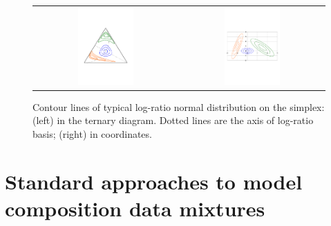 \documentclass[10pt, a4paper]{article}
\begin{document}
\begin{figure}[thbp]
\begin{center}
\begin{tabular}{cc}
  \includegraphics[trim=0cm 6cm 0cm 4cm,width=0.4\textwidth]{fig01_elipsesS3Axes.pdf} &\includegraphics[trim=0cm 6cm 0cm 4cm,width=0.4\textwidth]{fig01_elipsesS3AxesC.pdf} \\
 \end{tabular}
 \caption{Contour lines of typical log-ratio normal distribution on the simplex: (left) in the ternary diagram. Dotted lines are the axis of log-ratio basis; (right) in coordinates. }\label{fig01}
\end{center}
\end{figure}



\section{Standard approaches to model composition data mixtures}
\label{standard_section}
\end{document}
